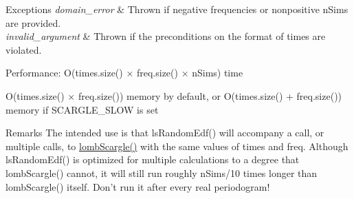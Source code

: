 \begin{DoxyExceptions}{Exceptions}
{\em domain\_\-error} & Thrown if negative frequencies or nonpositive nSims are provided. \\
\hline
{\em invalid\_\-argument} & Thrown if the preconditions on the format of times are violated.\\
\hline
\end{DoxyExceptions}
\begin{DoxyParagraph}{Performance:}
O(times.size() × freq.size() × nSims) time 
\end{DoxyParagraph}
\begin{DoxyParagraph}{}
O(times.size() × freq.size()) memory by default, or O(times.size() + freq.size()) memory if SCARGLE\_\-SLOW is set
\end{DoxyParagraph}
\begin{DoxyRemark}{Remarks}
The intended use is that lsRandomEdf() will accompany a call, or multiple calls, to \hyperlink{group__period_ga2c64d467f67fa7f90f96617275e057a7}{lombScargle()} with the same values of times and freq. Although lsRandomEdf() is optimized for multiple calculations to a degree that lombScargle() cannot, it will still run roughly nSims/10 times longer than lombScargle() itself. Don't run it after every real periodogram!
\end{DoxyRemark}
